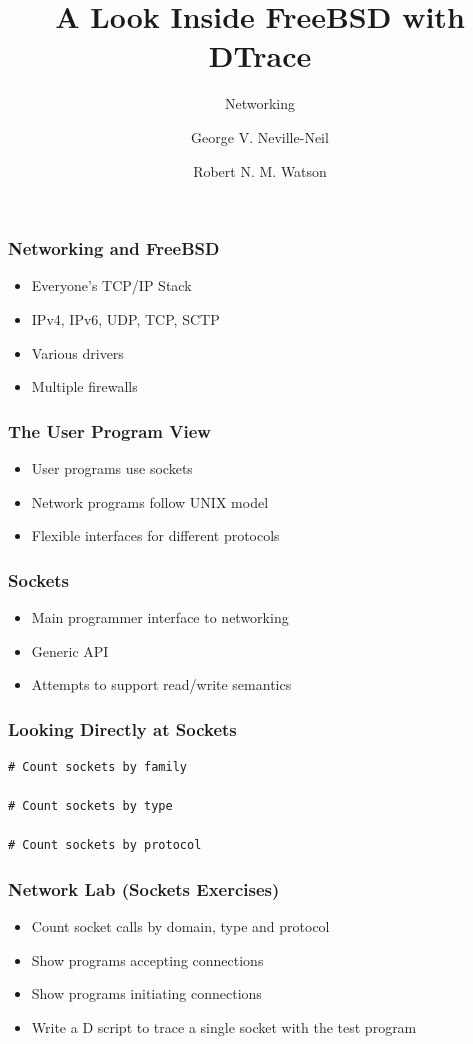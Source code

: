 \documentclass[pdftex]{beamer}
\begin{document}

\title{A Look Inside FreeBSD with DTrace}
\subtitle{Networking}
\author[shortname]{George V. Neville-Neil \and Robert N. M. Watson}

\begin{frame}
  \frametitle{Networking and FreeBSD}
  \begin{itemize}
  \item Everyone's TCP/IP Stack
  \item IPv4, IPv6, UDP, TCP, SCTP
  \item Various drivers
  \item Multiple firewalls
  \end{itemize}
\end{frame}

\begin{frame}
  \frametitle{The User Program View}
  \begin{itemize}
  \item User programs use sockets
  \item Network programs follow UNIX model
  \item Flexible interfaces for different protocols
  \end{itemize}
\end{frame}

\begin{frame}
  \frametitle{Sockets}
  \begin{itemize}
  \item Main programmer interface to networking
  \item Generic API
  \item Attempts to support read/write semantics
  \end{itemize}
\end{frame}

\begin{frame}[fragile]
  \frametitle{Looking Directly at Sockets}
\begin{verbatim}
# Count sockets by family

# Count sockets by type

# Count sockets by protocol
\end{verbatim}  
\end{frame}

\begin{frame}
  \frametitle{Network Lab (Sockets Exercises)}
  \begin{itemize}
  \item Count socket calls by domain, type and protocol
  \item Show programs accepting connections
  \item Show programs initiating connections
  \item Write a D script to trace a single socket with the test program
  \end{itemize}
\end{frame}
\end{document}
